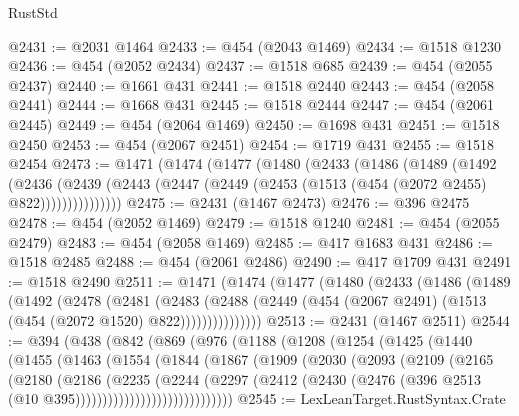 \begin{lexlean}{RustStd}
\begin{coremodule}
{\begin{coremodule}
{{{{{{{{{{{{{{{{{{{{{{{{{{{{{{{{@2431 := @2031 @1464
@2433 := @454 (@2043 @1469)
@2434 := @1518 @1230
@2436 := @454 (@2052 @2434)
@2437 := @1518 @685
@2439 := @454 (@2055 @2437)
@2440 := @1661 @431
@2441 := @1518 @2440
@2443 := @454 (@2058 @2441)
@2444 := @1668 @431
@2445 := @1518 @2444
@2447 := @454 (@2061 @2445)
@2449 := @454 (@2064 @1469)
@2450 := @1698 @431
@2451 := @1518 @2450
@2453 := @454 (@2067 @2451)
@2454 := @1719 @431
@2455 := @1518 @2454
@2473 := @1471
    (@1474
      (@1477
        (@1480
          (@2433
            (@1486
              (@1489
                (@1492
                  (@2436
                    (@2439
                      (@2443 (@2447 (@2449 (@2453 (@1513 (@454 (@2072 @2455) @822)))))))))))))))
@2475 := @2431 (@1467 @2473)
@2476 := @396 @2475
@2478 := @454 (@2052 @1469)
@2479 := @1518 @1240
@2481 := @454 (@2055 @2479)
@2483 := @454 (@2058 @1469)
@2485 := @417 @1683 @431
@2486 := @1518 @2485
@2488 := @454 (@2061 @2486)
@2490 := @417 @1709 @431
@2491 := @1518 @2490
@2511 := @1471
    (@1474
      (@1477
        (@1480
          (@2433
            (@1486
              (@1489
                (@1492
                  (@2478
                    (@2481
                      (@2483
                        (@2488
                          (@2449 (@454 (@2067 @2491) (@1513 (@454 (@2072 @1520) @822)))))))))))))))
@2513 := @2431 (@1467 @2511)
@2544 := @394
    (@438
      (@842
        (@869
          (@976
            (@1188
              (@1208
                (@1254
                  (@1425
                    (@1440
                      (@1455
                        (@1463
                          (@1554
                            (@1844
                              (@1867
                                (@1909
                                  (@2030
                                    (@2093
                                      (@2109
                                        (@2165
                                          (@2180
                                            (@2186
                                              (@2235
                                                (@2244
                                                  (@2297
                                                    (@2412
                                                      (@2430
                                                        (@2476
                                                          (@396
                                                            @2513
                                                            (@10 @395)))))))))))))))))))))))))))))
@2545 := LexLeanTarget.RustSyntax.Crate
}}}}}}}}}}}}}}}}}}}}}}}}}}}}}}}}
\end{coremodule}}
\end{coremodule}
\end{lexlean}
